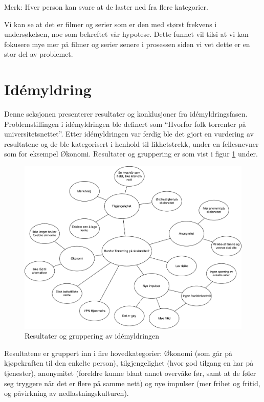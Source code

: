 Merk: Hver person kan svare at de laster ned fra flere kategorier.

\noindent Vi kan se at det er filmer og serier som er den med størst frekvens i undersøkelsen, noe som bekreftet vår hypotese. Dette funnet vil tilsi at vi kan fokusere mye mer på filmer og serier senere i prosessen siden vi vet dette er en stor del av problemet. 

\section{Idémyldring}
Denne seksjonen presenterer resultater og konklusjoner fra idémyldringsfasen. 
Problemstillingen i idémyldringen ble definert som ``Hvorfor folk torrenter på universitetsnettet''. Etter idémyldringen var ferdig ble det gjort en vurdering av resultatene og de ble kategorisert i henhold til likhetstrekk, under en fellesnevner som for eksempel Økonomi. Resultater og gruppering er som vist i figur \ref{fig:case1-idemyldring} under.  

\begin{figure}[H]
    \centering    
    \includegraphics[scale=0.45]{case_1/bilder/idemyldring}
    \caption[Idémyldring av fildeling]{Resultater og gruppering av idémyldringen}
    \label{fig:case1-idemyldring}
\end{figure}

Resultatene er gruppert inn i fire hovedkategorier: Økonomi (som går på kjøpekraften til den enkelte person), tilgjengelighet (hvor god tilgang en har på tjenester), anonymitet (foreldre kunne blant annet overvåke før, samt at de føler seg tryggere når det er flere på samme nett) og nye impulser (mer frihet og fritid, og påvirkning av nedlastningskulturen).

